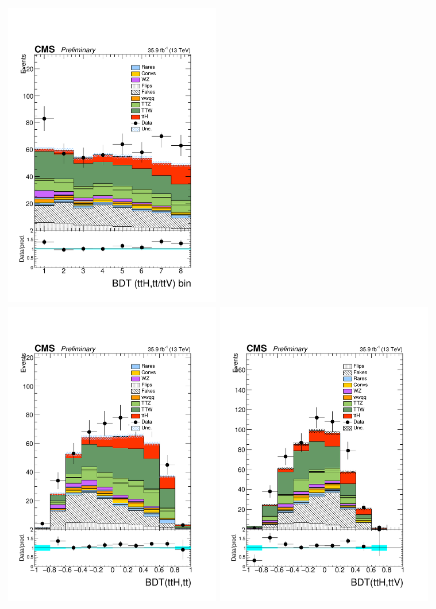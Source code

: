\begin{figure}[htp]
\centering
\includegraphics[width=0.49\textwidth]{ch9_figs/final_shape_bdtv8__ttH_stackPlot_SR.pdf}\\
\includegraphics[width=0.49\textwidth]{ch9_figs/tt_BDT_BDTv8_ttH_stackPlot_SR.pdf}
\includegraphics[width=0.49\textwidth]{ch9_figs/ttV_BDT_ttH_stackPlot_SR.pdf}

\end{figure}
